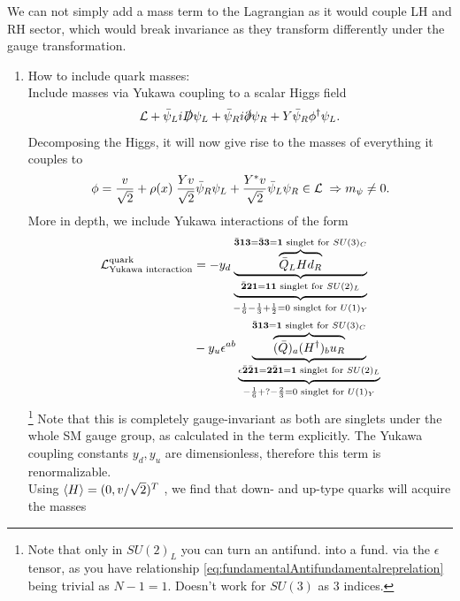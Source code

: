 We can not simply add a mass term to the Lagrangian as it would couple LH and RH sector, which would break invariance as they transform differently under the gauge transformation. 
\begin{enumerate} 
	\item How to include quark masses:\\
	Include masses via Yukawa coupling to a scalar Higgs field
	\begin{equation}
	\mathcal{L} + \bar{ \psi}_L i \slashed{D} \psi_L + \bar{\psi}_R i \slashed{\partial} \psi_R + Y \bar{\psi}_R \phi^\dagger \psi_L.
	\end{equation}
	Decomposing the Higgs, it will now give rise to the masses of everything it couples to
	\begin{equation}
	\phi=\frac{v}{\sqrt{2}}+\rho(x) \; \frac{Y v}{\sqrt{2}} \bar{ \psi}_R \psi_L + \frac{Y^* v}{\sqrt{2}} \bar{ \psi}_L \psi_R \in \mathcal{L}\; \Rightarrow m_\psi \neq 0.
	\end{equation}
	More in depth, we include Yukawa interactions of the form 
	\begin{align}
		\mathcal{L}^{\text{quark}}_{\text{Yukawa interaction}} &= -y_{d} \underbrace{\underbrace{\overbrace{\bar{Q}_L H d_R}^{\bar{\mathbf{3}} \mathbf{1} \mathbf{3} =\bar{\mathbf{3}} \mathbf{3}=\mathbf{1}\text{ singlet for } SU(3)_C }}_{\bar{\mathbf{2}} \mathbf{2} \mathbf{1}=\mathbf{1} \mathbf{1} \text{ singlet for } SU(2)_L}}_{-\frac{1}{6} -\frac{1}{3}+\frac{1}{2} =0 \text{ singlet for } U(1)_Y} \\
		&- y_u \epsilon^{ab}\underbrace{\underbrace{\overbrace{ (\bar{Q})_a (H^\dagger)_b u_R}^{\bar{\mathbf{3}} \mathbf{1} \mathbf{3} = \mathbf{1} \text{ singlet for } SU(3)_C} }_{\epsilon\bar{\mathbf{2}} \bar{\mathbf{2}} \mathbf{1} = \mathbf{2} \bar{\mathbf{2}} \mathbf{1}=\mathbf{1} \text{ singlet for } SU(2)_L }}_{-\frac{1}{6}+ ?-\frac{2}{3} = 0 \text{ singlet for } U(1)_Y} \nonumber
	\end{align}
	\footnote{Note that only in $SU(2)_L$ you can turn an antifund. into a fund. via the $\epsilon$ tensor, as you have relationship \ref{eq:fundamentalAntifundamentalreprelation} being trivial as $N-1=1$. Doesn't work for $SU(3)$ as $3$ indices.} 
	Note that this is completely gauge-invariant as both are singlets under the whole SM gauge group, as calculated in the term explicitly. The Yukawa coupling constants $y_{d},y_u$ are dimensionless, therefore this term is renormalizable.\\
	Using $\expval{H}=(0,v/\sqrt{2})^T$ , we find that down- and up-type quarks will acquire the masses

\end{enumerate}
